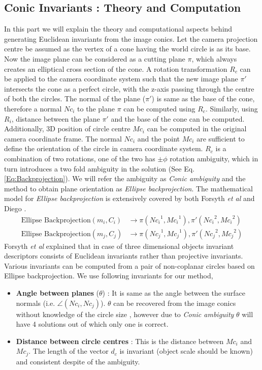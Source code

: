 \documentclass{bmvc2k}
\def\etal{\emph{et al}\bmvaOneDot}
\begin{document}
\subsection{Conic Invariants : Theory and Computation}
\label{subSec:ConicInv}
In this part we will explain the theory and computational aspects behind generating Euclidean invariants from the image conics. 
Let the camera projection centre be assumed as the vertex of a cone having the world circle is as its base.
Now the image plane can be considered as a cutting plane $\pi$, which always creates an elliptical cross section of the cone.  
A rotation transformation $R_c$ can be applied to the camera coordinate system such that the new image plane $\pi'$ intersects the cone as a perfect circle, with the z-axis passing through the centre of both the circles. 
The normal of the plane ($\pi'$) is same as the base of the cone, therefore a normal $Nc_i$ to the plane $ \pi $ can be computed using $R_c$. 
Similarly, using $ R_i $, distance between the plane $ \pi' $ and the base of the cone can be computed. 
Additionally, 3D position of circle centre $Mc_i$ can be computed in the original camera coordinate frame.
The normal $Nc_i$ and the point $Mc_i$ are sufficient to define the orientation of the circle in camera coordinate system.
$ R_c $ is a combination of two rotations, one of the two has $\pm \phi$ rotation ambiguity, which in turn introduces a two fold ambiguity in the solution (See Eq.\ref{Eq:Backprojection}). We will refer the ambiguity as \textit{Conic ambiguity} and the method to obtain plane orientation as \textit{Ellipse backprojection}. The mathematical model for \textit{Ellipse backprojection} is extensively covered by both Forsyth \etal \cite{forsyth_91} and Diego \cite{lo_pez_de_ipin_a_trip:_2002}. 
\begin{align} \label{Eq:Backprojection}
\text{Ellipse Backprojection}(m_i,C_i) &\rightarrow \pi({Nc_i}^1,{Mc_i}^1),\pi'({Nc_i}^2,{Mc_i}^2) \\ \nonumber
\text{Ellipse Backprojection}(m_j,C_j) &\rightarrow \pi({Nc_j}^1,{Mc_j}^1),\pi'({Nc_j}^2,{Mc_j}^2)
\end{align}
Forsyth \etal \cite{forsyth_91} explained that in case of three dimensional objects invariant descriptors consists of Euclidean invariants rather than projective invariants. 
Various invariants can be computed from a pair of non-coplanar circles based on Ellipse backprojection. 
We use following invariants for our method, 
\begin{itemize}
	\item \textbf{Angle between planes} ($\theta$) : It is same as the angle between the surface normals 
	(i.e. $ \angle(Nc_i,Nc_j) $). $\theta$ can be recovered from the image conics without knowledge of the circle size , however due to \textit{Conic ambiguity} $ \theta $ will have 4 solutions out of which only one is correct. 
	\item \textbf{Distance between circle centres} : This is the distance between $ Mc_i$ and $ Mc_j $. The length of the vector $d_c$ is invariant (object scale should be known) and consistent despite of the ambiguity. 
\end{itemize}
\end{document}
